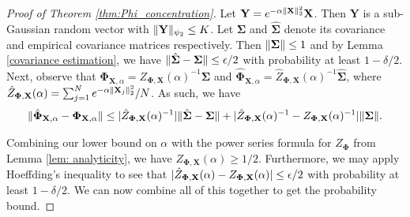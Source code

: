 \documentclass[final,12pt]{colt2018} %
\numberwithin{equation}{section}
\DeclarePairedDelimiter{\abs}{\lvert}{\rvert}
\DeclarePairedDelimiter{\norm}{\lVert}{\rVert}
\newcommand{\boldSigma}{\boldsymbol{\Sigma}}
\newcommand{\boldPhi}{\boldsymbol{\Phi}}
\newcommand{\boldX}{\textbf{X}}
\newcommand{\boldY}{\textbf{Y}}
\begin{document}
\begin{proof}[Proof of Theorem \ref{thm:Phi_concentration}]
	Let $\boldY = e^{-\alpha\norm{\boldX}_2^2}\boldX$. Then $\boldY$ is a sub-Gaussian random vector with $\norm{\boldY}_{\psi_2} \leq K$. Let $\boldSigma$ and $\hat{\boldSigma}$ denote its covariance and empirical covariance matrices respectively. Then $\norm{\boldSigma} \leq 1$ and by Lemma \ref{covariance estimation}, we have $\norm{\hat{\boldSigma} - \boldSigma} \leq \epsilon/2$ with probability at least $1 - \delta/2$. Next,
	observe that $\boldPhi_{\boldX,\alpha} = Z_{\boldPhi,\boldX}(\alpha)^{-1}\boldSigma$ and $\hat{\boldPhi}_{\boldX,\alpha} = \hat{Z}_{\boldPhi,\boldX}(\alpha)^{-1}\hat{\boldSigma}$, where $\hat{Z}_{\boldPhi,\boldX}(\alpha) = \sum_{j=1}^N e^{-\alpha\norm{\boldX_j}_2^2}/N$. As such, we have
	\begin{align}
	\norm{\hat{\boldPhi}_{\boldX,\alpha} - \boldPhi_{\boldX,\alpha}} \leq \abs{\hat{Z}_{\boldPhi,\boldX}(\alpha)^{-1}}\norm{\hat{\boldSigma} - \boldSigma} + \abs{\hat{Z}_{\boldPhi,\boldX}(\alpha)^{-1}-Z_{\boldPhi,\boldX}(\alpha)^{-1}}\norm{\boldSigma}.
	\end{align}
	
	Combining our lower bound on $\alpha$ with the power series formula for $Z_{\boldPhi}$ from Lemma \ref{lem: analyticity}, we have $Z_{\boldPhi,\boldX}(\alpha) \geq 1/2$. Furthermore, we may apply Hoeffding's inequality to see that $\abs{\hat{Z}_{\boldPhi,\boldX}(\alpha)-Z_{\boldPhi,\boldX}(\alpha)} \leq \epsilon/2$ with probability at least $1- \delta/2$. We can now combine all of this together to get the probability bound.
\end{proof}
\end{document}
